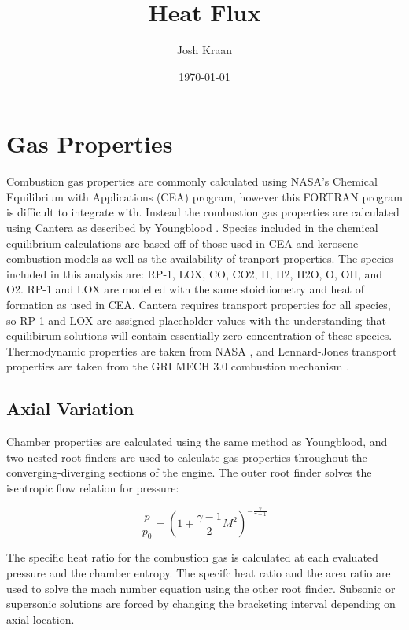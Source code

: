 \documentclass[11pt]{article}
\title{Heat Flux}
\author{Josh Kraan}
\date{\today}
\begin{document}
\maketitle

\section{Gas Properties}

Combustion gas properties are commonly calculated using NASA's Chemical Equilibrium with Applications (CEA) \cite{} program, however this FORTRAN program is difficult to integrate with. Instead the combustion gas properties are calculated using Cantera as described by Youngblood \cite{}. Species included in the chemical equilibrium calculations are based off of those used in CEA and kerosene combustion models \cite{} as well as the availability of tranport properties. The species included in this analysis are: RP-1, LOX, CO, CO2, H, H2, H2O, O, OH, and O2. RP-1 and LOX are modelled with the same stoichiometry and heat of formation as used in CEA. Cantera requires transport properties for all species, so RP-1 and LOX are assigned placeholder values with the understanding that equilibirum solutions will contain essentially zero concentration of these species. Thermodynamic properties are taken from NASA \cite{}, and Lennard-Jones transport properties are taken from the GRI MECH 3.0 combustion mechanism \cite{}.


\subsection{Axial Variation}


Chamber properties are calculated using the same method as Youngblood, and two nested root finders are used to calculate gas properties throughout the converging-diverging sections of the engine. The outer root finder solves the isentropic flow relation for pressure: %

\begin{equation}
  \frac{p}{p_0} = (1 + \frac{\gamma - 1}{2} M^2) ^ {- \frac{\gamma}{\gamma - 1}}
\end{equation}

The specific heat ratio for the combustion gas is calculated at each evaluated pressure and the chamber entropy. The specifc heat ratio and the area ratio are used to solve the mach number equation using the other root finder. Subsonic or supersonic solutions are forced by changing the bracketing interval depending on axial location.
\end{document}
